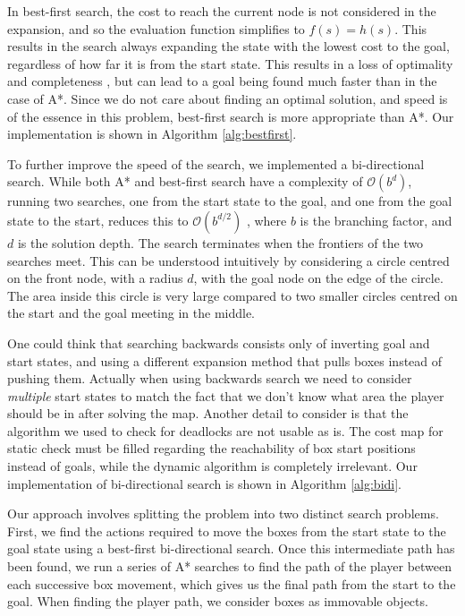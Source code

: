 \documentclass[a4paper,11pt]{article}
\begin{document}
In best-first search, the cost to reach the current node is not considered in
the expansion, and so the evaluation function simplifies to $f(s)=h(s)$. This
results in the search always expanding the state with the lowest cost to the
goal, regardless of how far it is from the start state. This results in a loss
of optimality and completeness \cite{aima}, but can lead to a goal being found
much faster than in the case of A*. Since we do not care about finding an
optimal solution, and speed is of the essence in this problem, best-first search
is more appropriate than A*. Our implementation is shown in Algorithm
\ref{alg:bestfirst}.

To further improve the speed of the search, we implemented a
bi-directional search. While both A* and best-first search have a
complexity of $\mathcal{O}(b^d)$, running two searches, one from the
start state to the goal, and one from the goal state to the start,
reduces this to $\mathcal{O}(b^{d/2})$ \cite{aima}, where $b$ is the
branching factor, and $d$ is the solution depth. The search terminates
when the frontiers of the two searches meet. This can be understood
intuitively by considering a circle centred on the front node, with a
radius $d$, with the goal node on the edge of the circle. The area
inside this circle is very large compared to two smaller circles
centred on the start and the goal meeting in the middle. 

One could think that searching backwards consists only of inverting
goal and start states, and using a different expansion method that
pulls boxes instead of pushing them. Actually when using backwards
search we need to consider \emph{multiple} start states to match the
fact that we don't know what area the player should be in after
solving the map. Another detail to consider is that the algorithm we
used to check for deadlocks are not usable as is. The cost map for
static check must be filled regarding the reachability of box start
positions instead of goals, while the dynamic algorithm is completely
irrelevant. Our implementation of bi-directional search is shown in
Algorithm \ref{alg:bidi}.

Our approach involves splitting the problem into two distinct search
problems. First, we find the actions required to move the boxes from the start
state to the goal state using a best-first bi-directional search. Once this
intermediate path has been found, we run a series of A* searches to find the
path of the player between each successive box movement, which gives us the
final path from the start to the goal. When finding the player path, we consider
boxes as immovable objects.
\end{document}
